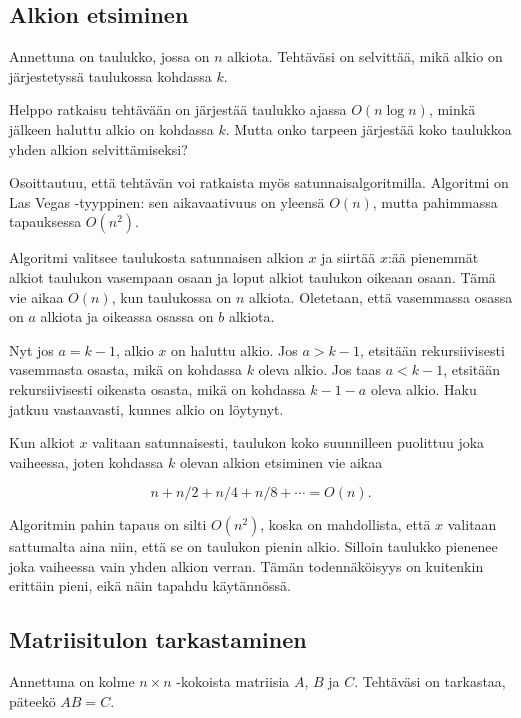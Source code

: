 \subsection{Alkion etsiminen}

\begin{task}
Annettuna on taulukko, jossa on $n$ alkiota.
Tehtäväsi on selvittää, mikä alkio on järjestetyssä
taulukossa kohdassa $k$.
\end{task}

Helppo ratkaisu tehtävään on järjestää
taulukko ajassa $O(n \log n)$, minkä jälkeen
haluttu alkio on kohdassa $k$.
Mutta onko tarpeen järjestää koko taulukkoa
yhden alkion selvittämiseksi?

Osoittautuu, että tehtävän voi ratkaista myös
satunnaisalgoritmilla.
Algoritmi on Las Vegas -tyyppinen:
sen aikavaativuus on yleensä $O(n)$,
mutta pahimmassa tapauksessa $O(n^2)$.

Algoritmi valitsee taulukosta satunnaisen alkion $x$
ja siirtää $x$:ää pienemmät alkiot
taulukon vasempaan osaan ja loput alkiot
taulukon oikeaan osaan.
Tämä vie aikaa $O(n)$, kun taulukossa on $n$ alkiota.
Oletetaan, että vasemmassa osassa on $a$
alkiota ja oikeassa osassa on $b$ alkiota.

Nyt jos $a=k-1$, alkio $x$ on haluttu alkio.
Jos $a>k-1$, etsitään rekursiivisesti
vasemmasta osasta, mikä on kohdassa $k$ oleva alkio.
Jos taas $a<k-1$, etsitään rekursiivisesti
oikeasta osasta, mikä on kohdassa $k-1-a$ oleva alkio.
Haku jatkuu vastaavasti, kunnes alkio on löytynyt.

Kun alkiot $x$ valitaan satunnaisesti,
taulukon koko suunnilleen puolittuu
joka vaiheessa, joten kohdassa $k$ olevan
alkion etsiminen vie aikaa

\[n+n/2+n/4+n/8+\cdots=O(n).\]

Algoritmin pahin tapaus on silti $O(n^2)$,
koska on mahdollista,
että $x$ valitaan sattumalta aina niin,
että se on taulukon pienin alkio.
Silloin taulukko pienenee joka vaiheessa
vain yhden alkion verran.
Tämän todennäköisyys on kuitenkin erittäin pieni,
eikä näin tapahdu käytännössä.

\subsection{Matriisitulon tarkastaminen}

\begin{task}
Annettuna on kolme $n \times n$ -kokoista matriisia
$A$, $B$ ja $C$.
Tehtäväsi on tarkastaa, päteekö $AB=C$.
\end{task}


